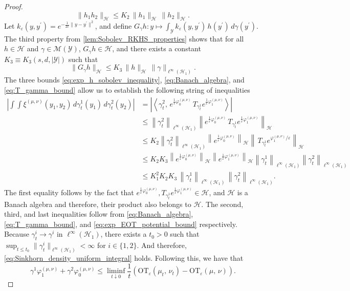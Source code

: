 \documentclass{article}
\theoremstyle{plain}
\theoremstyle{definition}
\theoremstyle{remark}
\newcommand{\of}[1]{\left(#1\right)}
\newcommand{\abs}[1]{\left|#1\right|}
\newcommand{\cH}{\mathcal{H}}
\newcommand{\cM}{\mathcal{M}}
\newcommand{\cY}{\mathcal{Y}}
\newcommand{\1}{\mathbbm{1}}
\newcommand{\EntOT}[2]{\text{OT}_\eps\of{#1,\, #2}}
\newcommand{\eps}{\varepsilon}
\newcommand{\iprod}[1]{\left\langle #1 \right\rangle}
\newcommand{\norm}[1]{\left \| #1 \right \|}
\theoremstyle{plain}
\theoremstyle{definition}
\begin{document}
\begin{proof}
    \begin{equation}\label{eq:Banach_algebra}
        \|h_1 h_2 \|_\cH \leq K_2 \,\|h_1\|_\cH \,\|h_2\|_\cH.
    \end{equation}
    Let $k_\eps (y, y^\prime) = e^{-\frac{1}{2\eps} \|y-y^\prime\|^2}$, and define $G_\gamma h: y \mapsto \int_\cY k_\eps(y, y^\prime) \, h(y^\prime) \,d\gamma(y^\prime)$. The third property from \cref{lem:Sobolev_RKHS_properties} shows that for all $h\in\cH$ and $\gamma \in \cM(\cY)$, $G_\gamma h \in \cH$, and there exists a constant $K_3 \equiv K_3(s,d, \abs{\cY})$ such that
    \begin{equation}\label{eq:T_gamma_bound}
        \| G_\gamma h \|_\cH \leq K_3 \, \|h \|_\cH \,\|\gamma\|_{\ell^\infty(\cH_1)}.
    \end{equation} 
    The three bounds \eqref{eq:exp_h_sobolev_inequality}, \eqref{eq:Banach_algebra}, and \eqref{eq:T_gamma_bound} allow us to establish the following string of inequalities
    \begin{align}\label{eq:xi_integral_uniform_bound}
        \abs{\int \int \xi^{(\mu, \nu)}(y_1, y_2) \, d\gamma_t^1(y_1) \, d\gamma_t^2(y_2)} &= \abs{\iprod{\gamma_t^2,\, e^{\frac{1}{\eps}\varphi_0^{(\mu, \nu)}} \,T_{\gamma_t^1} e^{\frac{1}{\eps}\varphi_1^{(\mu, \nu)}} }} \nonumber \\
        &\leq \norm{\gamma_t^2}_{\ell^\infty(\cH_1)} \norm{e^{\frac{1}{\eps}\varphi_0^{(\mu, \nu)}} \,T_{\gamma_t^1} e^{\frac{1}{\eps}\varphi_1^{(\mu, \nu)}}}_\cH \nonumber\\
        & \leq K_2 \norm{\gamma_t^2}_{\ell^\infty(\cH_1)} \norm{e^{\frac{1}{\eps}\varphi_0^{(\mu, \nu)}}}_\cH \norm{\,T_{\gamma_t^1} e^{\varphi_1^{(\mu, \nu)}/\eps}}_\cH  \nonumber \\
        & \leq K_2 K_3 \norm{e^{\frac{1}{\eps}\varphi_0^{(\mu, \nu)}}}_\cH \norm{e^{\frac{1}{\eps}\varphi_1^{(\mu, \nu)}}}_\cH  \norm{\gamma_t^1}_{\ell^\infty(\cH_1)} \norm{\gamma_t^2}_{\ell^\infty(\cH_1)} \nonumber \\
        &\leq K_1^2 K_2 K_3 \,\norm{\gamma_t^1}_{\ell^\infty(\cH_1)} \,\norm{\gamma_t^2}_{\ell^\infty(\cH_1)} .
    \end{align}
    The first equality follows by the fact that $e^{\frac{1}{\eps}\varphi_0^{(\mu, \nu)}}, T_{\gamma_t^1} e^{\frac{1}{\eps}\varphi_1^{(\mu, \nu)}} \in \cH$, and $\cH$ is a Banach algebra and therefore, their product also belongs to $\cH$. The second, third, and last inequalities follow from \eqref{eq:Banach_algebra}, \eqref{eq:T_gamma_bound}, and \eqref{eq:exp_EOT_potential_bound} respectively. Because $\gamma_t^i \to \gamma^i$ in $\ell^\infty(\cH_1)$, there exists a $t_0 > 0$ such that $\sup_{t \le t_0} \| \gamma_t^i \|_{\ell^\infty(\cH_1)} < \infty$ for $i \in \{1,2\}$. And therefore, \cref{eq:Sinkhorn_density_uniform_integral} holds. Following this, we have that
    \begin{equation}\label{eq:EOT_lowerbound}
        \gamma^1 \varphi_1^{(\mu, \nu)} + \gamma^2 \varphi_0^{(\mu, \nu)} \leq \liminf_{t \downarrow 0} \frac{1}{t} \of{\EntOT{\mu_t}{\nu_t} - \EntOT{\mu}{\nu}}.
    \end{equation}


\end{proof}
\end{document}
